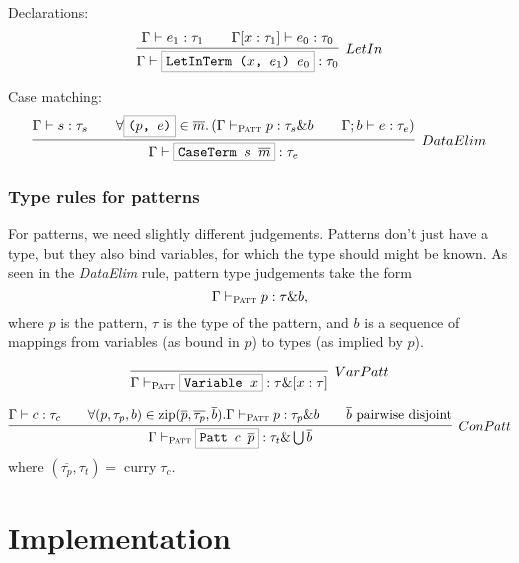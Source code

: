 \documentclass[a4paper]{scrartcl}
\newcommand{\hsterm}[1]{%
    \setlength{\fboxsep}{3pt}%
    \setlength{\fboxrule}{0.2pt}%
    \fbox{\texttt{#1}}}
\renewcommand{\vec}[1]{\overline{#1}}
\DeclareMathOperator{\zip}{zip}
\DeclareMathOperator{\curry}{curry}
\begin{document}
Declarations:
\begin{align*}
\infer[LetIn]%
    {\Gamma \vdash \hsterm{LetInTerm (\ensuremath{x}, \ensuremath{e_1}) \ensuremath{e_0}} : \tau_0}%
    {\Gamma \vdash e_1 : \tau_1 \qquad \Gamma [x : \tau_1] \vdash e_0 : \tau_0}
\end{align*}

Case matching:
\begin{align*}
\infer[DataElim]%
    {\Gamma \vdash \hsterm{CaseTerm \ensuremath{s} \ensuremath{\vec{m}}} : \tau_e}%
    {\Gamma \vdash s : \tau_s
    \qquad
    \forall \hsterm{(\ensuremath{p}, \ensuremath{e})} \in \vec{m}.\left(
        \Gamma \vdash_\textsc{Patt} p : \tau_s \& b \qquad
        \Gamma; b \vdash e : \tau_e
    \right)}
\end{align*}

\subsubsection{Type rules for patterns}
For patterns, we need slightly different judgements. Patterns don't just have
a type, but they also bind variables, for which the type should might be known.
As seen in the \textit{DataElim} rule, pattern type judgements take the form
\begin{equation*}
    \Gamma \vdash_\textsc{Patt} p : \tau \& b,
\end{equation*}
where $p$ is the pattern, $\tau$ is the type of the pattern, and $b$ is
a sequence of mappings from variables (as bound in $p$) to types (as implied
by $p$).

\begin{equation*}
\infer[VarPatt]%
    {\Gamma \vdash_\textsc{Patt} \hsterm{Variable \ensuremath{x}} : \tau \& [x : \tau]}%
    {}
\end{equation*}

\begin{equation*}
\infer[ConPatt]%
    {\Gamma \vdash_\textsc{Patt} \hsterm{Patt \ensuremath{c} \ensuremath{\vec{p}}} : \tau_t \& \bigcup \vec{b}}%
    {\Gamma \vdash c : \tau_c
    \qquad \forall (p,\tau_p,b) \in \zip(\vec{p}, \vec{\tau_p}, \vec{b}).
        \Gamma \vdash_\textsc{Patt} p : \tau_p \& b
    \qquad \text{$\vec{b}$ pairwise disjoint}}
\end{equation*}
where $(\vec{\tau_p}, \tau_t) = \curry \tau_c$.

\section{Implementation}
\end{document}
